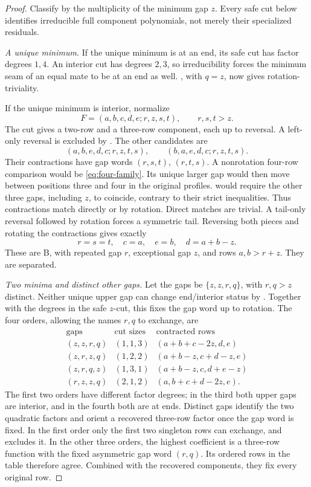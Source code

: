 \documentclass[11pt,a4paper]{amsart}
\numberwithin{equation}{section}
\theoremstyle{plain}
\theoremstyle{definition}
\begin{document}
\begin{proof}
Classify by the multiplicity of the minimum gap \(z\).
Every safe cut below identifies irreducible full component polynomials,
not merely their specialized residuals.

\emph{A unique minimum.}
If the unique minimum is at an end, its safe cut has factor degrees
\(1,4\).  An interior cut has degrees \(2,3\), so irreducibility
forces the minimum seam of an equal mate to be at an end as well.  
, with \(q=z\), now gives
rotation-triviality.  

If the unique minimum is interior, normalize
\[
 F=(a,b,c,d,e;r,z,s,t),\qquad r,s,t>z.
\]
The cut gives a two-row and a three-row component, each up to reversal.
A left-only reversal is excluded by
.  The other candidates are
\[
 (a,b,e,d,c;r,z,t,s),\qquad (b,a,e,d,c;r,z,t,s).
\]
Their contractions have gap words \((r,s,t)\), \((r,t,s)\).
A nonrotation four-row comparison would be
\eqref{eq:four-family}.  Its unique larger gap would then move between
positions three and four in the original profiles.
 would require the other three gaps,
including \(z\), to coincide, contrary to their strict inequalities.
Thus contractions match directly or by rotation.  Direct matches are
trivial.  A tail-only reversal followed by rotation forces a symmetric
tail.  Reversing both pieces and rotating the contractions gives exactly
\[
 r=s=t,\quad c=a,\quad e=b,\quad d=a+b-z.
\]
These are B, with repeated gap \(r\), exceptional gap \(z\), and
rows \(a,b>r+z\).  They are separated.

\emph{Two minima and distinct other gaps.}
Let the gaps be \(\{z,z,r,q\}\), with \(r,q>z\) distinct.
Neither unique upper gap can change end/interior status by
.  Together with the degrees in the
safe \(z\)-cut, this fixes the gap word up to rotation.  The four
orders, allowing the names \(r,q\) to exchange, are
\[
\begin{array}{c|c|c}
\text{gaps}&\text{cut sizes}&\text{contracted rows}\\\hline
(z,z,r,q)&(1,1,3)&(a+b+c-2z,d,e)\\
(z,r,z,q)&(1,2,2)&(a+b-z,c+d-z,e)\\
(z,r,q,z)&(1,3,1)&(a+b-z,c,d+e-z)\\
(r,z,z,q)&(2,1,2)&(a,b+c+d-2z,e).
\end{array}
\]
The first two orders have different factor degrees; in the third both
upper gaps are interior, and in the fourth both are at ends.
Distinct gaps identify the two quadratic factors and orient a recovered
three-row factor once the gap word is fixed.
In the first order only the first two singleton rows can exchange, and
 excludes it.
In the other three orders, the highest coefficient is a three-row
function with the fixed asymmetric gap word \((r,q)\).  Its ordered
rows in the table therefore agree.  Combined with the recovered
components, they fix every original row.


\end{proof}
\end{document}
